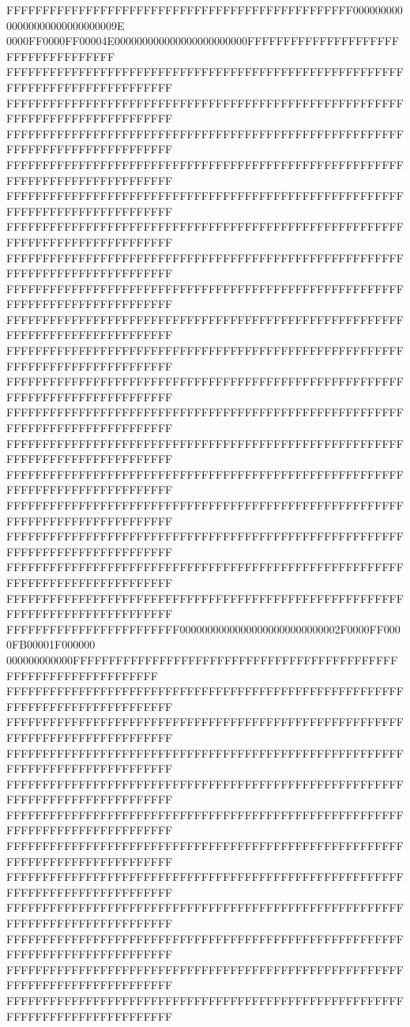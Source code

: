 FFFFFFFFFFFFFFFFFFFFFFFFFFFFFFFFFFFFFFFFFFFFFFFF00000000000000000000000000009E
0000FF0000FF00004E000000000000000000000000FFFFFFFFFFFFFFFFFFFFFFFFFFFFFFFFFFFF
FFFFFFFFFFFFFFFFFFFFFFFFFFFFFFFFFFFFFFFFFFFFFFFFFFFFFFFFFFFFFFFFFFFFFFFFFFFFFF
FFFFFFFFFFFFFFFFFFFFFFFFFFFFFFFFFFFFFFFFFFFFFFFFFFFFFFFFFFFFFFFFFFFFFFFFFFFFFF
FFFFFFFFFFFFFFFFFFFFFFFFFFFFFFFFFFFFFFFFFFFFFFFFFFFFFFFFFFFFFFFFFFFFFFFFFFFFFF
FFFFFFFFFFFFFFFFFFFFFFFFFFFFFFFFFFFFFFFFFFFFFFFFFFFFFFFFFFFFFFFFFFFFFFFFFFFFFF
FFFFFFFFFFFFFFFFFFFFFFFFFFFFFFFFFFFFFFFFFFFFFFFFFFFFFFFFFFFFFFFFFFFFFFFFFFFFFF
FFFFFFFFFFFFFFFFFFFFFFFFFFFFFFFFFFFFFFFFFFFFFFFFFFFFFFFFFFFFFFFFFFFFFFFFFFFFFF
FFFFFFFFFFFFFFFFFFFFFFFFFFFFFFFFFFFFFFFFFFFFFFFFFFFFFFFFFFFFFFFFFFFFFFFFFFFFFF
FFFFFFFFFFFFFFFFFFFFFFFFFFFFFFFFFFFFFFFFFFFFFFFFFFFFFFFFFFFFFFFFFFFFFFFFFFFFFF
FFFFFFFFFFFFFFFFFFFFFFFFFFFFFFFFFFFFFFFFFFFFFFFFFFFFFFFFFFFFFFFFFFFFFFFFFFFFFF
FFFFFFFFFFFFFFFFFFFFFFFFFFFFFFFFFFFFFFFFFFFFFFFFFFFFFFFFFFFFFFFFFFFFFFFFFFFFFF
FFFFFFFFFFFFFFFFFFFFFFFFFFFFFFFFFFFFFFFFFFFFFFFFFFFFFFFFFFFFFFFFFFFFFFFFFFFFFF
FFFFFFFFFFFFFFFFFFFFFFFFFFFFFFFFFFFFFFFFFFFFFFFFFFFFFFFFFFFFFFFFFFFFFFFFFFFFFF
FFFFFFFFFFFFFFFFFFFFFFFFFFFFFFFFFFFFFFFFFFFFFFFFFFFFFFFFFFFFFFFFFFFFFFFFFFFFFF
FFFFFFFFFFFFFFFFFFFFFFFFFFFFFFFFFFFFFFFFFFFFFFFFFFFFFFFFFFFFFFFFFFFFFFFFFFFFFF
FFFFFFFFFFFFFFFFFFFFFFFFFFFFFFFFFFFFFFFFFFFFFFFFFFFFFFFFFFFFFFFFFFFFFFFFFFFFFF
FFFFFFFFFFFFFFFFFFFFFFFFFFFFFFFFFFFFFFFFFFFFFFFFFFFFFFFFFFFFFFFFFFFFFFFFFFFFFF
FFFFFFFFFFFFFFFFFFFFFFFFFFFFFFFFFFFFFFFFFFFFFFFFFFFFFFFFFFFFFFFFFFFFFFFFFFFFFF
FFFFFFFFFFFFFFFFFFFFFFFFFFFFFFFFFFFFFFFFFFFFFFFFFFFFFFFFFFFFFFFFFFFFFFFFFFFFFF
FFFFFFFFFFFFFFFFFFFFFFFF00000000000000000000000000002F0000FF0000FB00001F000000
000000000000FFFFFFFFFFFFFFFFFFFFFFFFFFFFFFFFFFFFFFFFFFFFFFFFFFFFFFFFFFFFFFFFFF
FFFFFFFFFFFFFFFFFFFFFFFFFFFFFFFFFFFFFFFFFFFFFFFFFFFFFFFFFFFFFFFFFFFFFFFFFFFFFF
FFFFFFFFFFFFFFFFFFFFFFFFFFFFFFFFFFFFFFFFFFFFFFFFFFFFFFFFFFFFFFFFFFFFFFFFFFFFFF
FFFFFFFFFFFFFFFFFFFFFFFFFFFFFFFFFFFFFFFFFFFFFFFFFFFFFFFFFFFFFFFFFFFFFFFFFFFFFF
FFFFFFFFFFFFFFFFFFFFFFFFFFFFFFFFFFFFFFFFFFFFFFFFFFFFFFFFFFFFFFFFFFFFFFFFFFFFFF
FFFFFFFFFFFFFFFFFFFFFFFFFFFFFFFFFFFFFFFFFFFFFFFFFFFFFFFFFFFFFFFFFFFFFFFFFFFFFF
FFFFFFFFFFFFFFFFFFFFFFFFFFFFFFFFFFFFFFFFFFFFFFFFFFFFFFFFFFFFFFFFFFFFFFFFFFFFFF
FFFFFFFFFFFFFFFFFFFFFFFFFFFFFFFFFFFFFFFFFFFFFFFFFFFFFFFFFFFFFFFFFFFFFFFFFFFFFF
FFFFFFFFFFFFFFFFFFFFFFFFFFFFFFFFFFFFFFFFFFFFFFFFFFFFFFFFFFFFFFFFFFFFFFFFFFFFFF
FFFFFFFFFFFFFFFFFFFFFFFFFFFFFFFFFFFFFFFFFFFFFFFFFFFFFFFFFFFFFFFFFFFFFFFFFFFFFF
FFFFFFFFFFFFFFFFFFFFFFFFFFFFFFFFFFFFFFFFFFFFFFFFFFFFFFFFFFFFFFFFFFFFFFFFFFFFFF
FFFFFFFFFFFFFFFFFFFFFFFFFFFFFFFFFFFFFFFFFFFFFFFFFFFFFFFFFFFFFFFFFFFFFFFFFFFFFF
